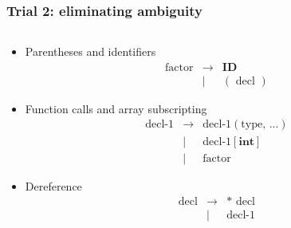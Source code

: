 \documentclass{beamer}
\begin{document}
\begin{frame}
    \frametitle{Trial 2: eliminating ambiguity}
    \begin{columns}
        \begin{column}[]{0.6\textwidth}
            \begin{itemize}
                \small
                \item Parentheses and identifiers
                      \begin{eqnarray*}
                          \text{factor} & \rightarrow & \textbf{ID} \\
                          & | & ( \text{ decl } )
                      \end{eqnarray*}
                \item Function calls and array subscripting
                      \begin{eqnarray*}
                          \text{decl-1} & \rightarrow & \text{decl-1}(\text{type, ...}) \\
                          & | & \text{decl-1}[\textbf{int}]\\
                          & | &\text{factor}
                      \end{eqnarray*}
                \item Dereference
                      \begin{eqnarray*}
                          \text{decl} & \rightarrow & \textbf{*}\text{ decl} \\
                          & | & \text{decl-1}

\end{eqnarray*}
\end{itemize}
\end{column}
\end{columns}
\end{frame}
\end{document}
